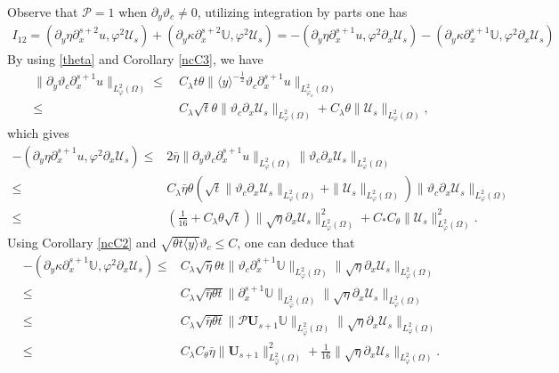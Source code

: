 \documentclass{amsart}
\numberwithin{equation}{section}
\newcommand\y{{{\langle y \rangle}}}
\begin{document}
Observe that $\mathcal{P}=1$ when $\partial_{y}\vartheta_{c}\neq0$, utilizing integration by parts one has
\begin{align*}
I_{12}
= (\partial_{y}\eta\partial_{x}^{s+2}u,\varphi^{2}\mathcal{U}_{s})
 +(\partial_{y}\kappa\partial_{x}^{s+2}\mathbb{U},\varphi^{2}\mathcal{U}_{s})
=-(\partial_{y}\eta\partial_{x}^{s+1}u,\varphi^{2}\partial_{x}\mathcal{U}_{s})
 -(\partial_{y}\kappa\partial_{x}^{s+1}\mathbb{U},\varphi^{2}\partial_{x}\mathcal{U}_{s})
\end{align*}
By using \eqref{theta} and Corollary \ref{ncC3}, we have
\begin{align*}
\|\partial_{y}\vartheta_{c}\partial_{x}^{s+1}u\|_{L_{\varphi}^{2}(\Omega)}
\leq&~C_{\lambda}t\theta\|\y^{-\frac{1}{2}}\vartheta_{c}\partial_{x}^{s+1}u\|_{L_{\varphi_{o}}^{2}(\Omega)}\\
\leq&~C_{\lambda}\sqrt{t}\theta\|\vartheta_{c}\partial_{x}\mathcal{U}_{s}\|_{L_{\varphi}^{2}(\Omega)}
     +C_{\lambda}\theta\|\mathcal{U}_{s}\|_{L_{\varphi}^{2}(\Omega)},
\end{align*}
which gives
\begin{align*}
-(\partial_{y}\eta\partial_{x}^{s+1}u,\varphi^{2}\partial_{x}\mathcal{U}_{s})
\leq& 2\bar{\eta}\|\partial_{y}\vartheta_{c}\partial_{x}^{s+1}u\|_{L_{\varphi}^{2}(\Omega)}
      \|\vartheta_{c}\partial_{x}\mathcal{U}_{s}\|_{L_{\varphi}^{2}(\Omega)}\\
\leq& C_{\lambda}\bar{\eta}\theta
      \left(\sqrt{t}\|\vartheta_{c}\partial_{x}\mathcal{U}_{s}\|_{L_{\varphi}^{2}(\Omega)}+\|\mathcal{U}_{s}\|_{L_{\varphi}^{2}(\Omega)}\right)
      \|\vartheta_{c}\partial_{x}\mathcal{U}_{s}\|_{L_{\varphi}^{2}(\Omega)}\\
\leq& \left(\frac{1}{16}+C_{\lambda}\theta\sqrt{t}\right)\|\sqrt{\eta}\partial_{x}\mathcal{U}_{s}\|_{L_{\varphi}^{2}(\Omega)}^{2}
     +C_{*}C_{\theta}\|\mathcal{U}_{s}\|_{L_{\varphi}^{2}(\Omega)}^{2}.
\end{align*}
Using Corollary \ref{ncC2} and $\sqrt{\theta t\y}\vartheta_{c}\leq C$, one can deduce that
\begin{align*}
-(\partial_{y}\kappa\partial_{x}^{s+1}\mathbb{U},\varphi^{2}\partial_{x}\mathcal{U}_{s})
\leq& C_{\lambda}\sqrt{\bar{\eta}}\theta t\|\vartheta_{c}\partial_{x}^{s+1}\mathbb{U}\|_{L_{\varphi}^{2}(\Omega)}
                 \|\sqrt{\eta}\partial_{x}\mathcal{U}_{s}\|_{L_{\varphi}^{2}(\Omega)}\\
\leq& C_{\lambda}\sqrt{\bar{\eta}\theta t}\|\partial_{x}^{s+1}\mathbb{U}\|_{L_{\hat{\varphi}}^{2}(\Omega)}
                 \|\sqrt{\eta}\partial_{x}\mathcal{U}_{s}\|_{L_{\varphi}^{2}(\Omega)}\\
\leq& C_{\lambda}\sqrt{\bar{\eta}\theta t}\|\mathcal{P}\mathbf{U}_{s+1}\mathbb{U}\|_{L_{\hat{\varphi}}^{2}(\Omega)}
                 \|\sqrt{\eta}\partial_{x}\mathcal{U}_{s}\|_{L_{\varphi}^{2}(\Omega)}\\
\leq& C_{\lambda}C_{\theta}\bar{\eta}\|\mathbf{U}_{s+1}\|_{L_{\hat{\varphi}}^{2}(\Omega)}^{2}
      +\frac{1}{16}\|\sqrt{\eta}\partial_{x}\mathcal{U}_{s}\|_{L_{\varphi}^{2}(\Omega)}.
\end{align*}
\end{document}

